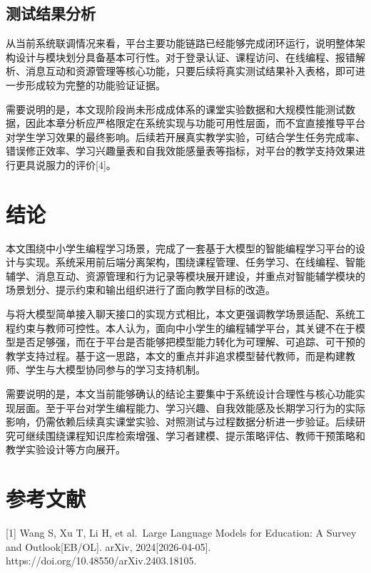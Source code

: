 \section{测试结果分析}\label{ux6d4bux8bd5ux7ed3ux679cux5206ux6790}

从当前系统联调情况来看，平台主要功能链路已经能够完成闭环运行，说明整体架构设计与模块划分具备基本可行性。对于登录认证、课程访问、在线编程、报错解析、消息互动和资源管理等核心功能，只要后续将真实测试结果补入表格，即可进一步形成较为完整的功能验证证据。

需要说明的是，本文现阶段尚未形成成体系的课堂实验数据和大规模性能测试数据，因此本章分析应严格限定在系统实现与功能可用性层面，而不宜直接推导平台对学生学习效果的最终影响。后续若开展真实教学实验，可结合学生任务完成率、错误修正效率、学习兴趣量表和自我效能感量表等指标，对平台的教学支持效果进行更具说服力的评价{[}4{]}。

\chapter{结论}\label{ux7ed3ux8bba}

本文围绕中小学生编程学习场景，完成了一套基于大模型的智能编程学习平台的设计与实现。系统采用前后端分离架构，围绕课程管理、任务学习、在线编程、智能辅学、消息互动、资源管理和行为记录等模块展开建设，并重点对智能辅学模块的场景划分、提示约束和输出组织进行了面向教学目标的改造。

与将大模型简单接入聊天接口的实现方式相比，本文更强调教学场景适配、系统工程约束与教师可控性。本人认为，面向中小学生的编程辅学平台，其关键不在于模型是否足够强，而在于平台是否能够把模型能力转化为可理解、可追踪、可干预的教学支持过程。基于这一思路，本文的重点并非追求模型替代教师，而是构建教师、学生与大模型协同参与的学习支持机制。

需要说明的是，本文当前能够确认的结论主要集中于系统设计合理性与核心功能实现层面。至于平台对学生编程能力、学习兴趣、自我效能感及长期学习行为的实际影响，仍需依赖后续真实课堂实验、对照测试与过程数据分析进一步验证。后续研究可继续围绕课程知识库检索增强、学习者建模、提示策略评估、教师干预策略和教学实验设计等方向展开。

\chapter*{参考文献}\label{ux53c2ux8003ux6587ux732e}

{[}1{]} Wang S, Xu T, Li H, et al.~Large Language Models for Education: A Survey and Outlook{[}EB/OL{]}. arXiv, 2024{[}2026-04-05{]}. https://doi.org/10.48550/arXiv.2403.18105.

